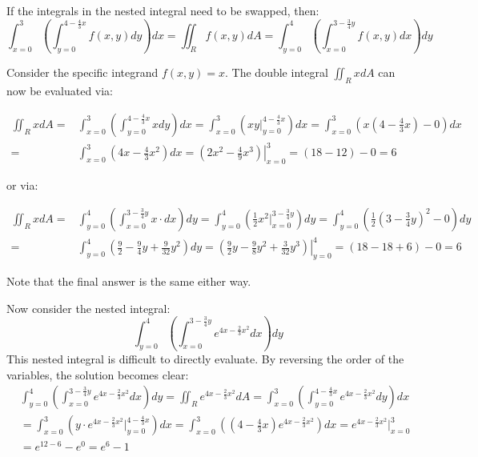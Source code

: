 \documentclass{article}
\begin{document}
If the integrals in the nested integral need to be swapped, then:
\[\int_{x = 0}^3 \left(\int_{y = 0}^{4 - \frac{4}{3}x} f(x,y)dy\right)dx = \iint_R f(x,y)dA = \int_{y = 0}^4 \left(\int_{x = 0}^{3 - \frac{3}{4}y} f(x,y)dx\right)dy\]

Consider the specific integrand \(f(x, y) = x\). The double integral \(\iint_R x dA\) can now be evaluated via:

\begin{align*}
\iint_R x dA = & \int_{x = 0}^3 \left(\int_{y = 0}^{4 - \frac{4}{3}x} x dy\right)dx 
= \int_{x = 0}^3 \left(xy\Big|_{y = 0}^{4 - \frac{4}{3}x}\right)dx     
= \int_{x = 0}^3 \left(x\left(4 - \frac{4}{3}x\right) - 0\right)dx \\
= & \int_{x = 0}^3 \left(4x - \frac{4}{3}x^2\right)dx 
= \left.\left(2x^2 - \frac{4}{9}x^3\right)\right|_{x = 0}^3 
= (18 - 12) - 0 = 6
\end{align*}

or via:

\begin{align*}
\iint_R x dA = & \int_{y = 0}^4 \left(\int_{x = 0}^{3 - \frac{3}{4}y} x \cdot dx\right)dy 
= \int_{y = 0}^4 \left(\frac{1}{2}x^2\Big|_{x = 0}^{3 - \frac{3}{4}y}\right)dy  
= \int_{y = 0}^4 \left(\frac{1}{2}\left(3 - \frac{3}{4}y\right)^2 - 0\right)dy \\  
= & \int_{y = 0}^4 \left(\frac{9}{2} - \frac{9}{4}y + \frac{9}{32}y^2\right)dy 
= \left.\left(\frac{9}{2}y - \frac{9}{8}y^2 + \frac{3}{32}y^3\right)\right|_{y = 0}^4 
= (18 - 18 + 6) - 0 = 6
\end{align*}

Note that the final answer is the same either way.

Now consider the nested integral:
\[\int_{y = 0}^4 \left(\int_{x = 0}^{3 - \frac{3}{4}y} e^{4x - \frac{2}{3}x^2}dx\right)dy\] 
This nested integral is difficult to directly evaluate. By reversing the order of the variables, the solution becomes clear:
\begin{align*}
& \int_{y = 0}^4 \left(\int_{x = 0}^{3 - \frac{3}{4}y} e^{4x - \frac{2}{3}x^2}dx\right)dy  
= \iint_R e^{4x - \frac{2}{3}x^2}dA 
= \int_{x = 0}^3 \left(\int_{y = 0}^{4 - \frac{4}{3}x} e^{4x - \frac{2}{3}x^2}dy\right)dx \\ 
& = \int_{x = 0}^3 \left(y \cdot e^{4x - \frac{2}{3}x^2}\Big|_{y = 0}^{4 - \frac{4}{3}x}\right)dx
= \int_{x = 0}^3 \left((4 - \frac{4}{3}x)e^{4x - \frac{2}{3}x^2}\right)dx 
= e^{4x - \frac{2}{3}x^2}\Big|_{x = 0}^3 \\
& = e^{12 - 6} - e^0
= e^6 - 1
\end{align*}
\end{document}

